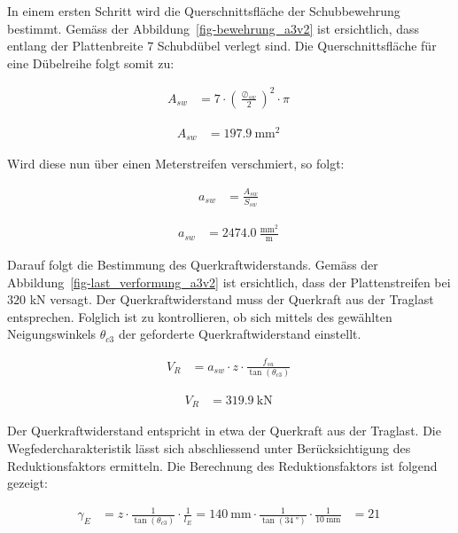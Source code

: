\documentclass[
  11pt,
  letterpaper,
]{scrreprt}
\begin{document}
In einem ersten Schritt wird die Querschnittsfläche der Schubbewehrung
bestimmt. Gemäss der Abbildung~\ref{fig-bewehrung_a3v2} ist ersichtlich,
dass entlang der Plattenbreite \(7\) Schubdübel verlegt sind. Die
Querschnittsfläche für eine Dübelreihe folgt somit zu:

$$
\begin{aligned}
A_{sw} &= 7 \cdot \left( \frac{ \oslash_{sw} }{ 2 } \right) ^{ 2 } \cdot \pi \; 
\end{aligned}
$$

$$
\begin{aligned}
A_{sw} &= 197.9\ \mathrm{mm}^{2} \;
\end{aligned}
$$

Wird diese nun über einen Meterstreifen verschmiert, so folgt:

$$
\begin{aligned}
a_{sw} &= \frac{ A_{sw} }{ S_{sw} } \; 
\end{aligned}
$$

$$
\begin{aligned}
a_{sw} &= 2474.0\ \frac{\mathrm{mm}^{2}}{\mathrm{m}} \;
\end{aligned}
$$

Darauf folgt die Bestimmung des Querkraftwiderstands. Gemäss der
Abbildung~\ref{fig-last_verformung_a3v2} ist ersichtlich, dass der
Plattenstreifen bei \(320\) kN versagt. Der Querkraftwiderstand muss der
Querkraft aus der Traglast entsprechen. Folglich ist zu kontrollieren,
ob sich mittels des gewählten Neigungswinkels \(\theta_{c3}\) der
geforderte Querkraftwiderstand einstellt.

$$
\begin{aligned}
V_{R} &= a_{sw} \cdot z \cdot \frac{ f_{su} }{ \tan \left( \theta_{c3} \right) } \; 
\end{aligned}
$$

$$
\begin{aligned}
V_{R} &= 319.9\ \mathrm{kN} \;
\end{aligned}
$$

Der Querkraftwiderstand entspricht in etwa der Querkraft aus der
Traglast. Die Wegfedercharakteristik lässt sich abschliessend unter
Berücksichtigung des Reduktionsfaktors ermitteln. Die Berechnung des
Reduktionsfaktors ist folgend gezeigt:

$$
\begin{aligned}
\gamma_{E} &= z \cdot \frac{ 1 }{ \tan \left( \theta_{c3} \right) } \cdot \frac{1} { l_{E} }  = 140\ \mathrm{mm} \cdot \frac{ 1 }{ \tan \left( 34\ \mathrm{°} \right) } \cdot \frac{1} { 10\ \mathrm{mm} } &= 21\  
\end{aligned}
$$
\end{document}
